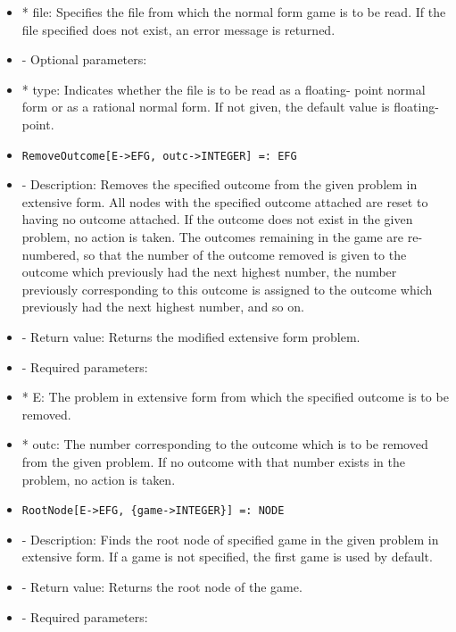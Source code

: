 \begin{itemize}
\bd
\item
*  file:  Specifies the file from which the normal form game is to be
read.  If the file specified does not exist, an error message
is returned.
\ed

\item
- Optional parameters:
	

\bd
\item
*  type:  Indicates whether the file is to be read as a floating-
point normal form or as a rational normal form.  If not given,
the default value is floating-point.
\ed
\ed

\item

\begin{verbatim}
RemoveOutcome[E->EFG, outc->INTEGER] =: EFG
\end{verbatim}

\bd
\item
- Description:  Removes the specified outcome from the given problem in
extensive form.  All nodes with the specified outcome attached are 
reset to having no outcome attached.  If the outcome does not exist in
the given problem, no action is taken.  The outcomes remaining in the 
game are re-numbered, so that the number of the outcome removed is 
given to the outcome which previously had the next highest number, the
number previously corresponding to this outcome is assigned to the
outcome which previously had the next highest number, and so on.  
\item  
- Return value:  Returns the modified extensive form problem.
\item
- Required parameters:
	
\bd
\item
*  E:  The problem in extensive form from which the specified outcome
is to be removed.
\item
*  outc:  The number corresponding to the outcome which is to be 
removed from the given problem.  If no outcome with that number
exists in the problem, no action is taken.
\ed
\ed

\item
\begin{verbatim}
RootNode[E->EFG, {game->INTEGER}] =: NODE
\end{verbatim}

\bd
\item
- Description:  Finds the root node of specified game in the given 
problem in extensive form.  If a game is not specified, the first game 
is used by default.
\item
- Return value:  Returns the root node of the game.
\item
- Required parameters:
	

\end{itemize}
